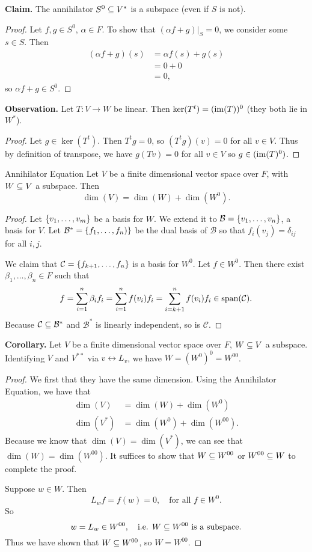 \documentclass[class=article, crop=false]{standalone}
\begin{document}
  \textbf{Claim.} The annihilator $S^0\subseteq V^*$ is a subspace (even if $S$ is not).
  \begin{proof}
    Let $f, g\in S^0$, $\alpha\in F$. To show that $(\alpha f + g)|_S = 0$, we consider some $s\in S$. Then
    \begin{align*}
      (\alpha f + g)(s) &= \alpha f(s) + g(s) \\
                        &= 0 + 0 \\
                        &= 0,
    \end{align*}
    so $\alpha f + g\in S^0$.
  \end{proof}
  \textbf{Observation.} Let $T\colon V\to W$ be linear. Then $\ker(T^t) = (\operatorname{im}(T))^0$ (they both lie in $W^*$).
  \begin{proof}
    Let $g\in \ker(T^t)$. Then $T^tg = 0$, so $(T^tg)(v) = 0$ for all $v\in V$. Thus by definition of transpose, we have $g(Tv) = 0$ for all $v\in V$ so $g\in (\operatorname{im}(T)^0)$.
  \end{proof}
  \begin{theorem}{Annihilator Equation}
    Let $V$ be a finite dimensional vector space over $F$, with $W\subseteq V$ a subspace. Then
    \[
      \dim(V) = \dim(W) + \dim(W^0).
    \]
  \end{theorem}
  \begin{proof}
    Let $\left\{v_1,\dotsc,v_m\right\}$ be a basis for $W$. We extend it to $\mathcal{B} = \left\{v_1,\dotsc,v_n\right\}$, a basis for $V$. Let $\mathcal{B}^* = \left\{f_1,\dotsc,f_n)\right\}$ be the dual basis of $\mathcal{B}$ so that $f_i(v_j) = \delta_{ij}$ for all $i, j$. \par
    We claim that $\mathcal{C} = \left\{f_{k+1},\dotsc,f_n\right\}$ is a basis for $W^0$. Let $f\in W^0$. Then there exist $\beta_1,\dotsc,\beta_n\in F$ such that 
    \[
      f = \sum_{i=1}^{n}\beta_if_i = \sum_{i=1}^{n}f(v_i)f_i = \sum_{i=k+1}^{n}f(v_i)f_i \in \operatorname{span}(\mathcal{C}).
    \]
    Because $\mathcal{C}\subseteq \mathcal{B}^*$ and $\mathcal{B}^*$ is linearly independent, so is $\mathcal{C}$.
  \end{proof}
  \textbf{Corollary.} Let $V$ be a finite dimensional vector space over $F$, $W\subseteq V$ a subspace. Identifying $V$ and $V^{* *}$ via $v\leftrightarrow L_v$, we have $W = (W^0)^0 = W^{00}$.
  \begin{proof}
    We first that they have the same dimension. Using the Annihilator Equation, we have that
    \begin{align*}
      \dim(V) &= \dim(W) + \dim(W^0) \\
      \dim(V^*) &= \dim(W^0) + \dim(W^{00}).
    \end{align*}
    Because we know that $\dim(V) = \dim(V^*)$, we can see that $\dim(W) = \dim(W^{00})$. It suffices to show that $W\subseteq W^{00}$ or $W^{00}\subseteq W$ to complete the proof. \par
    Suppose $w\in W$. Then
    \[
      L_wf = f(w) = 0, \quad \text{for all }f\in W^0.
    \]
    So 
    \[
      w = L_w\in W^{00}, \quad\text{i.e. $W\subseteq W^{00}$ is a subspace.}
    \]
    Thus we have shown that $W\subseteq W^{00}$, so $W = W^{00}$.
  \end{proof}
\end{document}
